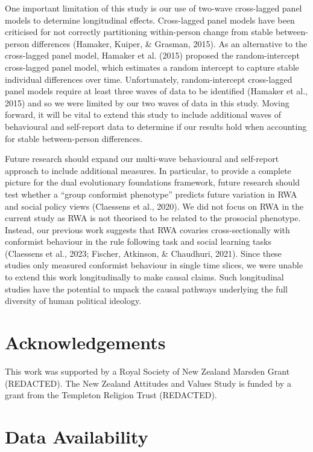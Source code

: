 \documentclass[
  man,floatsintext]{apa6}
\begin{document}
One important limitation of this study is our use of two-wave cross-lagged
panel models to determine longitudinal effects. Cross-lagged panel models have
been criticised for not correctly partitioning within-person change from stable
between-person differences (Hamaker, Kuiper, \& Grasman, 2015). As an alternative to the
cross-lagged panel model, Hamaker et al. (2015) proposed the random-intercept
cross-lagged panel model, which estimates a random intercept to capture stable
individual differences over time. Unfortunately, random-intercept cross-lagged
panel models require at least three waves of data to be identified
(Hamaker et al., 2015) and so we were limited by our two waves of data in this study.
Moving forward, it will be vital to extend this study to include additional
waves of behavioural and self-report data to determine if our results hold when
accounting for stable between-person differences.

Future research should expand our multi-wave behavioural and self-report
approach to include additional measures. In particular, to provide a complete
picture for the dual evolutionary foundations framework, future research should
test whether a ``group conformist phenotype'' predicts future variation in RWA
and social policy views (Claessens et al., 2020). We did not focus on RWA in the current
study as RWA is not theorised to be related to the prosocial phenotype. Instead,
our previous work suggests that RWA covaries cross-sectionally with conformist
behaviour in the rule following task and social learning tasks (Claessens et al., 2023; Fischer, Atkinson, \& Chaudhuri, 2021). Since these studies only measured conformist behaviour in
single time slices, we were unable to extend this work longitudinally to make
causal claims. Such longitudinal studies have the potential to unpack the causal
pathways underlying the full diversity of human political ideology.

\newpage
\nolinenumbers

\hypertarget{acknowledgements}{%
\section{Acknowledgements}\label{acknowledgements}}

This work was supported by a Royal Society of New Zealand Marsden Grant
(REDACTED). The New Zealand Attitudes and Values Study is funded by a grant
from the Templeton Religion Trust (REDACTED).

\hypertarget{data-availability}{%
\section{Data Availability}\label{data-availability}}
\end{document}
